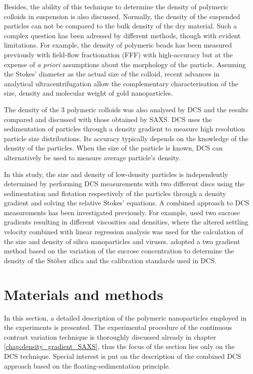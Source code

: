 Besides, the ability of this technique to determine the density of polymeric colloids in suspension is also discussed. Normally, the density of the suspended particles can not be compared to the bulk density of the dry material. Such a complex question has been adressed by different methods, though with evident limitations. For example, the density of polymeric beads has been measured previously with field-flow fractionation (FFF) with high-accuracy but at the expense of \emph{a priori} assumptions about the morphology of the particle\citep{giddings_density_1981,yang_colloid_1983,caldwell_measurement_1986}. Assuming the Stokes' diameter as the actual size of the colloid, recent advances in analytical ultracentrifugation allow the complementary characterisation of the size, density and molecular weight of gold nanoparticles\citep{carney_determination_2011}.

The density of the 3 polymeric colloids was also analysed by DCS and the results compared and discussed with those obtained by SAXS. DCS uses the sedimentation of particles through a density gradient to measure high resolution particle size distributions\citep{minelli_characterization_2014}. Its accuracy typically depends on the knowledge of the density of the particles. When the size of the particle is known, DCS can alternatively be used to measure average particle's density.

In this study, the size and density of low-density particles is independently determined by performing DCS measurements with two different discs using the sedimentation and flotation respectively of the particles through a density gradient and solving the relative Stokes' equations. A combined approach to DCS measurements has been investigated previously. For example, \cite{neumann_new_2013} used two sucrose gradients resulting in different viscosities and densities, where the altered settling velocity combined with linear regression analysis was used for the calculation of the size and density of silica nanoparticles and viruses. \cite{bell_emerging_2012} adopted a two gradient method based on the variation of the sucrose concentration to determine the density of the St\"ober silica and the calibration standards used in DCS.

\section{Materials and methods}
In this section, a detailed description of the polymeric nanoparticles employed in the experiments is presented. The experimental procedure of the continuous contrast variation technique is thoroughly discussed already in chapter \ref{chap:density_gradient_SAXS}, thus the focus of the section lies only on the DCS technique. Special interest is put on the description of the combined DCS approach based on the floating-sedimentation principle.


